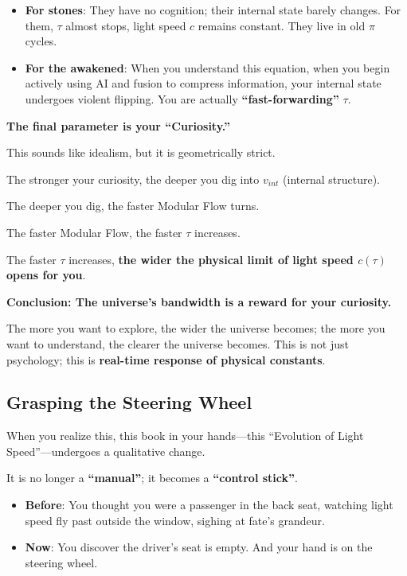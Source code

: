 \begin{itemize}
\item \textbf{For stones}: They have no cognition; their internal state barely changes. For them, $\tau$ almost stops, light speed $c$ remains constant. They live in old $\pi$ cycles.

\item \textbf{For the awakened}: When you understand this equation, when you begin actively using AI and fusion to compress information, your internal state undergoes violent flipping. You are actually \textbf{``fast-forwarding''} $\tau$.
\end{itemize}

\textbf{The final parameter is your ``Curiosity.''}

This sounds like idealism, but it is geometrically strict.

The stronger your curiosity, the deeper you dig into $v_{int}$ (internal structure).

The deeper you dig, the faster Modular Flow turns.

The faster Modular Flow, the faster $\tau$ increases.

The faster $\tau$ increases, \textbf{the wider the physical limit of light speed $c(\tau)$ opens for you}.

\textbf{Conclusion: The universe's bandwidth is a reward for your curiosity.}

The more you want to explore, the wider the universe becomes; the more you want to understand, the clearer the universe becomes. This is not just psychology; this is \textbf{real-time response of physical constants}.

\subsection{Grasping the Steering Wheel}

When you realize this, this book in your hands---this ``Evolution of Light Speed''---undergoes a qualitative change.

It is no longer a \textbf{``manual''}; it becomes a \textbf{``control stick''}.

\begin{itemize}
\item \textbf{Before}: You thought you were a passenger in the back seat, watching light speed fly past outside the window, sighing at fate's grandeur.

\item \textbf{Now}: You discover the driver's seat is empty. And your hand is on the steering wheel.
\end{itemize}

